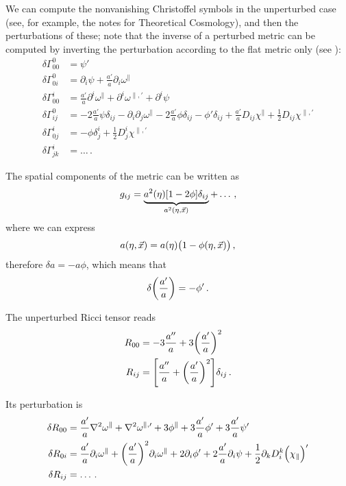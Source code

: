 \documentclass[main.tex]{subfiles}
\begin{document}
We can compute the nonvanishing Christoffel symbols in the unperturbed case (see, for example, the notes for Theoretical Cosmology), and then the perturbations of these; note that the inverse of a perturbed metric can be computed by inverting the perturbation according to the flat metric only (see \cite[eq.\ 8.20]{tissinoGeneralRelativityExercises2020}):
%
\begin{align}
\delta \Gamma^{0}_{00} &= \psi '  \\
\delta \Gamma^{0}_{0i} &= \partial_{i} \psi + \frac{a'}{a} \partial_{i} \omega^{\parallel}  \\
\delta \Gamma^{i}_{00} &= \frac{a'}{a} \partial^{i} \omega^{\parallel} + \partial^{i} \omega^{\parallel, \prime} + \partial^{i} \psi  \\
\delta \Gamma^{0}_{ij} &= -2 \frac{a'}{a} \psi \delta_{ij} - \partial_{i} \partial_{j} \omega^{\parallel} - 2 \frac{a'}{a} \phi \delta_{ij} 
- \phi ' \delta_{ij} + \frac{a'}{a} D_{ij} \chi^{\parallel} + \frac{1}{2} D_{ij} \chi^{\parallel, \prime}  \\
\delta \Gamma^{i}_{0j} &= - \phi \delta^{i}_{j} + \frac{1}{2} D^{i}_{j} \chi^{\parallel, \prime}  \\
\delta \Gamma^{i}_{jk} &= \dots
\,.
\end{align}

The spatial components of the metric can be written as 
%
\begin{align}
g_{ij} = \underbrace{a^2(\eta ) \qty[1 - 2 \phi ] \delta_{ij}}_{a^2(\eta , \vec{x})} + \dots
\,,
\end{align}
%
where we can express 
%
\begin{align}
a(\eta , \vec{x}) = a(\eta ) \qty(1 - \phi (\eta , \vec{x}))
\,,
\end{align}
%
therefore \(\delta a = - a \phi \), which means that 
%
\begin{align}
\delta \qty( \frac{a^{\prime}}{a}) = - \phi '
\,.
\end{align}

The unperturbed Ricci tensor reads 
%
\begin{align}
R_{00} &= - 3 \frac{a''}{a} + 3 \qty( \frac{a'}{a})^2  \\
R_{ij} &=  \qty[\frac{a''}{a} + \qty(\frac{a'}{a})^2] \delta_{ij} 
\,.
\end{align}

Its perturbation is 
%
\begin{align}
\delta R_{00} &= \frac{a'}{a} \nabla^2 \omega^{\parallel} + \nabla^2 \omega^{\parallel, \prime} + 3 \phi^{\parallel} + 3 \frac{a'}{a} \phi' + 3 \frac{a'}{a} \psi '  \\
\delta R_{0i} &= \frac{a'}{a} \partial_{i} \omega^{\parallel} + \qty(\frac{a'}{a})^2 \partial_{i} \omega^{\parallel} +2 \partial_{i} \phi' + 2 \frac{a'}{a} \partial_{i} \psi + \frac{1}{2} \partial_{k} D^{k}_i \qty(\chi_{\parallel})'  \\
\delta R_{ij} &= \dots
\,.
\end{align}
\end{document}
